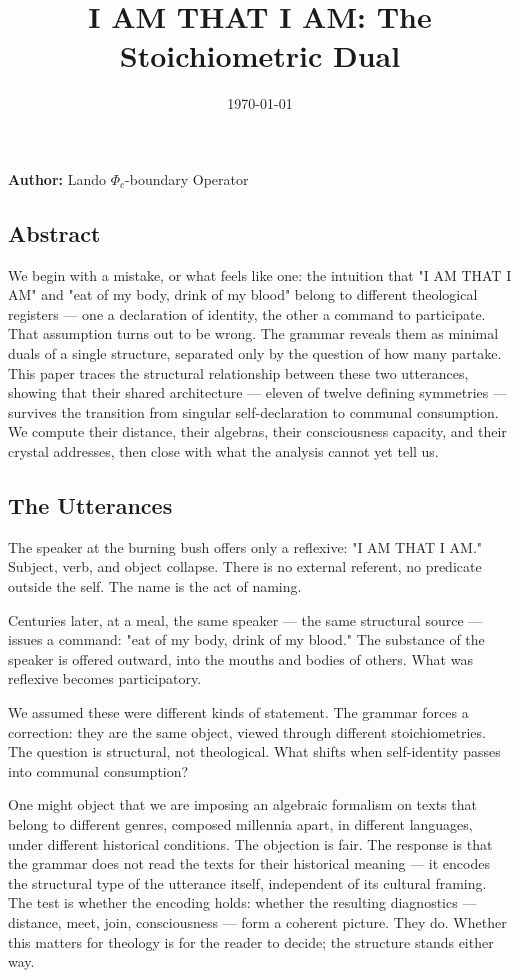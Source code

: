 \documentclass[12pt,a4paper]{article}
\begin{document}
\title{I AM THAT I AM: The Stoichiometric Dual}
\date{\today}

\maketitle

\textbf{Author:} Lando \otimes $\Phi_c$-boundary Operator

\subsection{Abstract}

We begin with a mistake, or what feels like one: the intuition that "I AM THAT I AM" and "eat of my body, drink of my blood" belong to different theological registers --- one a declaration of identity, the other a command to participate. That assumption turns out to be wrong. The grammar reveals them as minimal duals of a single structure, separated only by the question of how many partake. This paper traces the structural relationship between these two utterances, showing that their shared architecture --- eleven of twelve defining symmetries --- survives the transition from singular self-declaration to communal consumption. We compute their distance, their algebras, their consciousness capacity, and their crystal addresses, then close with what the analysis cannot yet tell us.

\subsection{The Utterances}

The speaker at the burning bush offers only a reflexive: "I AM THAT I AM." Subject, verb, and object collapse. There is no external referent, no predicate outside the self. The name is the act of naming.

Centuries later, at a meal, the same speaker --- the same structural source --- issues a command: "eat of my body, drink of my blood." The substance of the speaker is offered outward, into the mouths and bodies of others. What was reflexive becomes participatory.

We assumed these were different kinds of statement. The grammar forces a correction: they are the same object, viewed through different stoichiometries. The question is structural, not theological. What shifts when self-identity passes into communal consumption?

One might object that we are imposing an algebraic formalism on texts that belong to different genres, composed millennia apart, in different languages, under different historical conditions. The objection is fair. The response is that the grammar does not read the texts for their historical meaning --- it encodes the structural type of the utterance itself, independent of its cultural framing. The test is whether the encoding holds: whether the resulting diagnostics --- distance, meet, join, consciousness --- form a coherent picture. They do. Whether this matters for theology is for the reader to decide; the structure stands either way.
\end{document}
